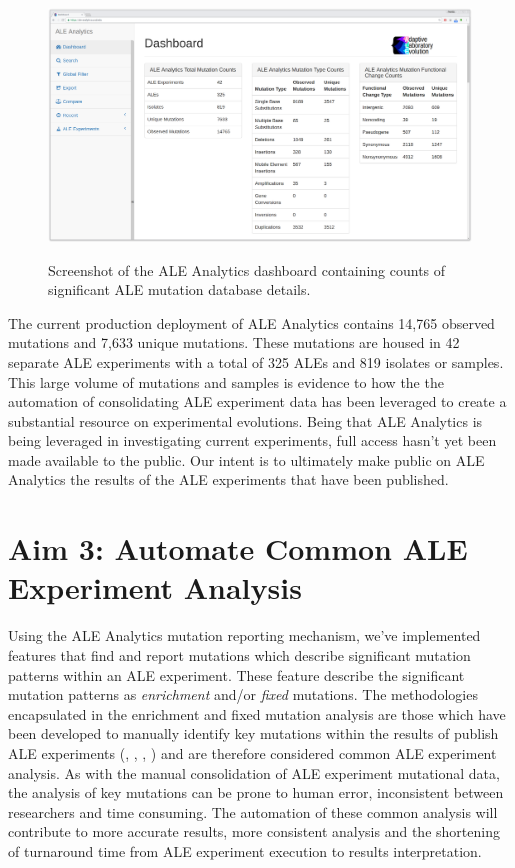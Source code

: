 \documentclass[12pt,final,masters,chapterheads]{ucsd}  %
\begin{document}
\begin{figure}[H]
  \caption{Screenshot of the ALE Analytics dashboard containing counts of significant ALE mutation database details.}
  \centering
  \includegraphics[width=1\textwidth]{dashboard_screenshot.png}
  \label{fig:dashboard_screenshot}
\end{figure}

The current production deployment of ALE Analytics contains 14,765 observed mutations and 7,633 unique mutations. These mutations are housed in 42 separate ALE experiments with a total of 325 ALEs and 819 isolates or samples. This large volume of mutations and samples is evidence to how the the automation of consolidating ALE experiment data has been leveraged to create a substantial resource on experimental evolutions. Being that ALE Analytics is being leveraged in investigating current experiments, full access hasn't yet been made available to the public. Our intent is to ultimately make public on ALE Analytics the results of the ALE experiments that have been published.

% 
% 
\chapter{Aim 3: Automate Common ALE Experiment Analysis}

Using the ALE Analytics mutation reporting mechanism, we've implemented features that find and report mutations which describe significant mutation patterns within an ALE experiment. These feature describe the significant mutation patterns as \textit{enrichment} and/or \textit{fixed} mutations. The methodologies encapsulated in the enrichment and fixed mutation analysis are those which have been developed to manually identify key mutations within the results of publish ALE experiments (\cite{10.1371/journal.pgen.1001186}, \cite{pmid25015645}, \cite{pmid26964043}, \cite{pmid25304508}) and are therefore considered common ALE experiment analysis. As with the manual consolidation of ALE experiment mutational data, the analysis of key mutations can be prone to human error, inconsistent between researchers and time consuming. The automation of these common analysis will contribute to more accurate results, more consistent analysis and the shortening of turnaround time from ALE experiment execution to results interpretation.
\end{document}
